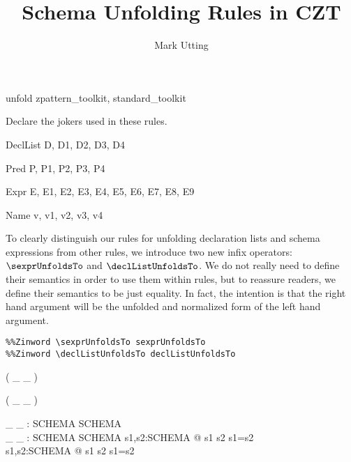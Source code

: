 \documentclass{article}
\title{Schema Unfolding Rules in CZT}
\author{Mark Utting}
\begin{document}
\maketitle

\begin{zsection}
  \SECTION unfold \parents zpattern\_toolkit, standard\_toolkit
\end{zsection}

Declare the jokers used in these rules.

\begin{zedjoker}{DeclList} D, D1, D2, D3, D4 \end{zedjoker}
\begin{zedjoker}{Pred} P, P1, P2, P3, P4 \end{zedjoker}
\begin{zedjoker}{Expr} E, E1, E2, E3, E4, E5, E6, E7, E8, E9 \end{zedjoker}
\begin{zedjoker}{Name} v, v1, v2, v3, v4 \end{zedjoker}

To clearly distinguish our rules for unfolding declaration lists and
schema expressions from other rules, we introduce two new infix
operators: $\sexprUnfoldsTo$ and $\declListUnfoldsTo$.  
We do not really need to define their semantics in order to use them within
rules, but to reassure readers, we define their semantics to be just
equality.  In fact, the intention is that the right hand argument
will be the unfolded and normalized form of the left hand argument.

\begin{verbatim}
%%Zinword \sexprUnfoldsTo sexprUnfoldsTo
%%Zinword \declListUnfoldsTo declListUnfoldsTo
\end{verbatim}

\begin{zed}
  \relation ( \_ \sexprUnfoldsTo \_ )
\end{zed}
\begin{zed}
  \relation ( \_ \declListUnfoldsTo \_ )
\end{zed}


\begin{gendef}[SCHEMA]
  \_ \sexprUnfoldsTo \_ : SCHEMA \rel SCHEMA \\
  \_ \declListUnfoldsTo \_ : SCHEMA \rel SCHEMA
\where
  \forall s1,s2:SCHEMA @ s1 \sexprUnfoldsTo s2 \iff s1=s2 \\
  \forall s1,s2:SCHEMA @ s1 \declListUnfoldsTo s2 \iff s1=s2 \\
\end{gendef}
\end{document}
